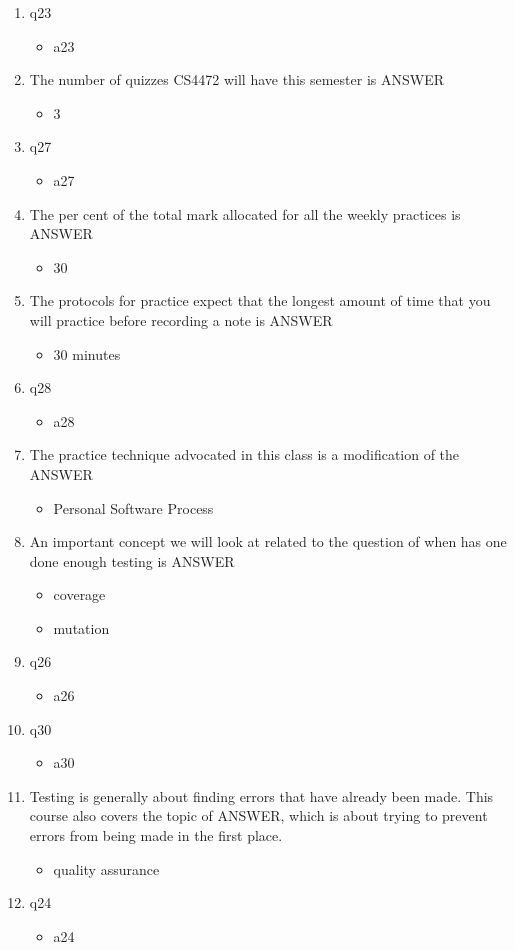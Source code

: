 \documentclass{exam}
\begin{document}
\begin{enumerate}
\begin{itemize}
\end{itemize}
\item q23
\begin{itemize}
\item a23
\end{itemize}
\item The number of quizzes CS4472 will have this semester is ANSWER
\begin{itemize}
\item 3
\end{itemize}
\item q27
\begin{itemize}
\item a27
\end{itemize}
\item The per cent of the total mark allocated for all the weekly practices is ANSWER
\begin{itemize}
\item 30
\end{itemize}
\item The protocols for practice expect that the longest amount of time that you will practice before recording a note is ANSWER
\begin{itemize}
\item 30 minutes
\end{itemize}
\item q28
\begin{itemize}
\item a28
\end{itemize}
\item The practice technique advocated in this class is a modification of the ANSWER
\begin{itemize}
\item Personal Software Process
\end{itemize}
\item An important concept we will look at related to the question of when has one done enough testing is ANSWER
\begin{itemize}
\item coverage
\item mutation
\end{itemize}
\item q26
\begin{itemize}
\item a26
\end{itemize}
\item q30
\begin{itemize}
\item a30
\end{itemize}
\item Testing is generally about finding errors that have already been made.  This course also covers the topic of ANSWER, which is about trying to prevent errors from being made in the first place.
\begin{itemize}
\item quality assurance
\end{itemize}
\item q24
\begin{itemize}
\item a24
\end{itemize}
\end{enumerate}
\end{document}
